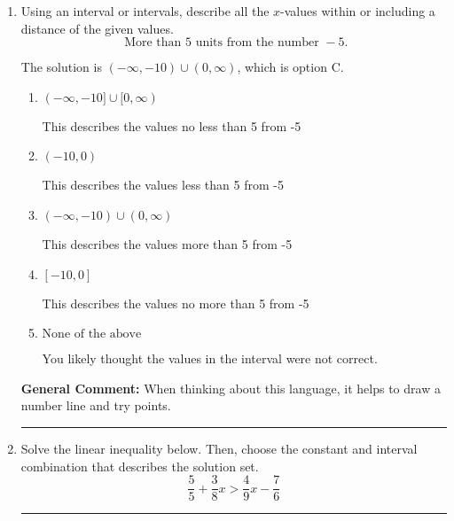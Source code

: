 \documentclass{extbook}[14pt]
\newcommand{\litem}[1]{\item #1

\rule{\textwidth}{0.4pt}}
\begin{document}
\begin{enumerate}
{The solution is \( \text{None of the above} \), which is option E.\begin{enumerate}[label=\Alph*.]
\item \( (-\infty, -1) \cup (11, \infty) \)

This describes the values more than 6 from 5
\item \( (-1, 11) \)

This describes the values less than 6 from 5
\item \( (-\infty, -1] \cup [11, \infty) \)

This describes the values no less than 6 from 5
\item \( [-1, 11] \)

This describes the values no more than 6 from 5
\item \( \text{None of the above} \)

Options A-D described the values [more/less than] 6 units from 5, which is the reverse of what the question asked.
\end{enumerate}

\textbf{General Comment:} When thinking about this language, it helps to draw a number line and try points.
}
\litem{
Using an interval or intervals, describe all the $x$-values within or including a distance of the given values.
\[ \text{ More than } 5 \text{ units from the number } -5. \]

The solution is \( (-\infty, -10) \cup (0, \infty) \), which is option C.\begin{enumerate}[label=\Alph*.]
\item \( (-\infty, -10] \cup [0, \infty) \)

This describes the values no less than 5 from -5
\item \( (-10, 0) \)

This describes the values less than 5 from -5
\item \( (-\infty, -10) \cup (0, \infty) \)

This describes the values more than 5 from -5
\item \( [-10, 0] \)

This describes the values no more than 5 from -5
\item \( \text{None of the above} \)

You likely thought the values in the interval were not correct.
\end{enumerate}

\textbf{General Comment:} When thinking about this language, it helps to draw a number line and try points.
}
\litem{
Solve the linear inequality below. Then, choose the constant and interval combination that describes the solution set.
\[ \frac{5}{5} + \frac{3}{8} x > \frac{4}{9} x - \frac{7}{6} \]

}
\end{enumerate}
\end{document}
